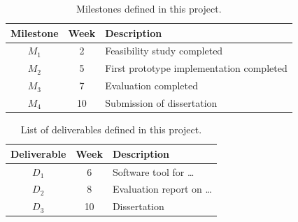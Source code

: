 \documentclass[a4paper,11pt]{article}
\begin{document}
\begin{table}[htbp]
    \begin{center}
        \begin{tabular}{|c|c|l|}
        \hline
        \textbf{Milestone} & \textbf{Week} & \textbf{Description} \\
        \hline
        $M_1$ & 2 & Feasibility study completed \\
        $M_2$ & 5 & First prototype implementation completed \\
        $M_3$ & 7 & Evaluation completed \\
        $M_4$ & 10 & Submission of dissertation \\
        \hline
        \end{tabular}
    \end{center}
    \caption{Milestones defined in this project.}
    \label{fig:milestones}
\end{table}

\begin{table}[htbp]
    \begin{center}
        \begin{tabular}{|c|c|l|}
        \hline
        \textbf{Deliverable} & \textbf{Week} & \textbf{Description} \\
        \hline
        $D_1$ & 6 & Software tool for \dots\\
        $D_2$ & 8 & Evaluation report on \dots\\
        $D_3$ & 10 & Dissertation \\
        \hline
        \end{tabular}
    \end{center}
    \caption{List of deliverables defined in this project.}
    \label{fig:deliverables}
\end{table}

\clearpage

{\small
}
\end{document}
